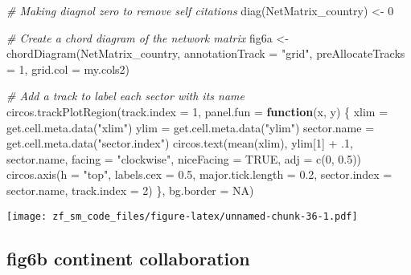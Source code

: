 \documentclass[
]{article}
\newenvironment{Shaded}{\begin{snugshade}}{\end{snugshade}}
\newcommand{\AttributeTok}[1]{\textcolor[rgb]{0.77,0.63,0.00}{#1}}
\newcommand{\CommentTok}[1]{\textcolor[rgb]{0.56,0.35,0.01}{\textit{#1}}}
\newcommand{\ConstantTok}[1]{\textcolor[rgb]{0.00,0.00,0.00}{#1}}
\newcommand{\ControlFlowTok}[1]{\textcolor[rgb]{0.13,0.29,0.53}{\textbf{#1}}}
\newcommand{\DecValTok}[1]{\textcolor[rgb]{0.00,0.00,0.81}{#1}}
\newcommand{\FloatTok}[1]{\textcolor[rgb]{0.00,0.00,0.81}{#1}}
\newcommand{\FunctionTok}[1]{\textcolor[rgb]{0.00,0.00,0.00}{#1}}
\newcommand{\NormalTok}[1]{#1}
\newcommand{\OtherTok}[1]{\textcolor[rgb]{0.56,0.35,0.01}{#1}}
\newcommand{\SpecialCharTok}[1]{\textcolor[rgb]{0.00,0.00,0.00}{#1}}
\newcommand{\StringTok}[1]{\textcolor[rgb]{0.31,0.60,0.02}{#1}}
\begin{document}
\begin{Shaded}
\begin{Highlighting}[]
\CommentTok{\# Making diagnol zero to remove self citations }
\FunctionTok{diag}\NormalTok{(NetMatrix\_country) }\OtherTok{\textless{}{-}} \DecValTok{0}

\CommentTok{\# Create a chord diagram of the network matrix}
\NormalTok{fig6a }\OtherTok{\textless{}{-}} \FunctionTok{chordDiagram}\NormalTok{(NetMatrix\_country, }\AttributeTok{annotationTrack =} \StringTok{"grid"}\NormalTok{, }\AttributeTok{preAllocateTracks =} \DecValTok{1}\NormalTok{, }\AttributeTok{grid.col =}\NormalTok{ my.cols2)}

\CommentTok{\# Add a track to label each sector with its name}
\FunctionTok{circos.trackPlotRegion}\NormalTok{(}\AttributeTok{track.index =} \DecValTok{1}\NormalTok{, }\AttributeTok{panel.fun =} \ControlFlowTok{function}\NormalTok{(x, y) \{}
\NormalTok{  xlim }\OtherTok{=} \FunctionTok{get.cell.meta.data}\NormalTok{(}\StringTok{"xlim"}\NormalTok{)}
\NormalTok{  ylim }\OtherTok{=} \FunctionTok{get.cell.meta.data}\NormalTok{(}\StringTok{"ylim"}\NormalTok{)}
\NormalTok{  sector.name }\OtherTok{=} \FunctionTok{get.cell.meta.data}\NormalTok{(}\StringTok{"sector.index"}\NormalTok{)}
  \FunctionTok{circos.text}\NormalTok{(}\FunctionTok{mean}\NormalTok{(xlim), ylim[}\DecValTok{1}\NormalTok{] }\SpecialCharTok{+}\NormalTok{ .}\DecValTok{1}\NormalTok{, sector.name, }\AttributeTok{facing =} \StringTok{"clockwise"}\NormalTok{, }\AttributeTok{niceFacing =} \ConstantTok{TRUE}\NormalTok{, }\AttributeTok{adj =} \FunctionTok{c}\NormalTok{(}\DecValTok{0}\NormalTok{, }\FloatTok{0.5}\NormalTok{))}
  \FunctionTok{circos.axis}\NormalTok{(}\AttributeTok{h =} \StringTok{"top"}\NormalTok{, }\AttributeTok{labels.cex =} \FloatTok{0.5}\NormalTok{, }\AttributeTok{major.tick.length =} \FloatTok{0.2}\NormalTok{, }\AttributeTok{sector.index =}\NormalTok{ sector.name, }\AttributeTok{track.index =} \DecValTok{2}\NormalTok{)}
\NormalTok{\}, }\AttributeTok{bg.border =} \ConstantTok{NA}\NormalTok{)}
\end{Highlighting}
\end{Shaded}

\texttt{[image: zf\_sm\_code\_files/figure-latex/unnamed-chunk-36-1.pdf]}

\hypertarget{fig6b-continent-collaboration}{%
\subsection{fig6b continent
collaboration}\label{fig6b-continent-collaboration}}
\end{document}
